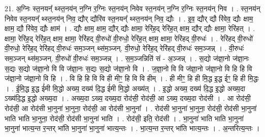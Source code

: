\documentclass[17pt]{extarticle}
\begin{document}
21. अ॒ग्निः स्त॒नयन्᳚ थ्स्त॒नय॑न् न॒ग्नि र॒ग्निः स्त॒नय॑न् निवेव स्त॒नय॑न् न॒ग्नि र॒ग्निः स्त॒नय॑न् निव । . स्त॒नय॑न् निवेव स्त॒नयन्᳚ थ्स्त॒नय॑न् निव॒ द्यौर् द्यौरि॑व स्त॒नयन्᳚ थ्स्त॒नय॑न् निव॒ द्यौः । . इ॒व॒ द्यौर् द्यौ रि॑वेव॒ द्यौः क्षाम॒ क्षाम॒ द्यौ रि॑वेव॒ द्यौः क्षाम॑ । . द्यौः क्षाम॒ क्षाम॒ द्यौर् द्यौः क्षामा॒ रेरि॑ह॒द् रेरि॑ह॒त् क्षाम॒ द्यौर् द्यौः क्षामा॒ रेरि॑हत् । . क्षामा॒ रेरि॑ह॒द् रेरि॑ह॒त् क्षाम॒ क्षामा॒ रेरि॑हद् वी॒रुधो॑ वी॒रुधो॒ रेरि॑ह॒त् क्षाम॒ क्षामा॒ रेरि॑हद् वी॒रुधः॑ । . रेरि॑हद् वी॒रुधो॑ वी॒रुधो॒ रेरि॑ह॒द् रेरि॑हद् वी॒रुधः॑ सम॒ञ्जन् थ्स॑म॒ञ्जन्. वी॒रुधो॒ रेरि॑ह॒द् रेरि॑हद् वी॒रुधः॑ सम॒ञ्जन्न् । . वी॒रुधः॑ सम॒ञ्जन् थ्स॑म॒ञ्जन्. वी॒रुधो॑ वी॒रुधः॑ सम॒ञ्जन्न् । . स॒म॒ञ्जन्निति॑ सं - अ॒ञ्जन्न् । . स॒द्यो ज॑ज्ञा॒नो ज॑ज्ञा॒नः स॒द्यः स॒द्यो ज॑ज्ञा॒नो वि वि ज॑ज्ञा॒नः स॒द्यः स॒द्यो ज॑ज्ञा॒नो वि । . ज॒ज्ञा॒नो वि वि ज॑ज्ञा॒नो ज॑ज्ञा॒नो वि हि हि वि ज॑ज्ञा॒नो ज॑ज्ञा॒नो वि हि । . वि हि हि वि वि ही मीꣳ॒॒ हि वि वि हीम् । . ही मीꣳ॒॒ हि ही मि॒द्ध इ॒द्ध ईꣳ॒॒ हि ही मि॒द्धः । . ई॒मि॒द्ध इ॒द्ध ई॑मी मि॒द्धो अख्य॒ दख्य॑ दि॒द्ध ई॑मी मि॒द्धो अख्य॑त् । . इ॒द्धो अख्य॒ दख्य॑ दि॒द्ध इ॒द्धो अख्य॒दा ऽख्य॑दि॒द्ध इ॒द्धो अख्य॒दा । . अख्य॒दा ऽख्य॒ दख्य॒दा रोद॑सी॒ रोद॑सी॒ आ ऽख्य॒ दख्य॒दा रोद॑सी । . आ रोद॑सी॒ रोद॑सी॒ आ रोद॑सी भा॒नुना॑ भा॒नुना॒ रोद॑सी॒ आ रोद॑सी भा॒नुना᳚ । . रोद॑सी भा॒नुना॑ भा॒नुना॒ रोद॑सी॒ रोद॑सी भा॒नुना॑ भाति भाति भा॒नुना॒ रोद॑सी॒ रोद॑सी भा॒नुना॑ भाति । . रोद॑सी॒ इति॒ रोद॑सी । . भा॒नुना॑ भाति भाति भा॒नुना॑ भा॒नुना॑ भात्य॒न्त र॒न्तर् भा॑ति भा॒नुना॑ भा॒नुना॑ भात्य॒न्तः । . भा॒त्य॒न्त र॒न्तर् भा॑ति भात्य॒न्तः । . अ॒न्तरित्य॒न्तः । \newline
\end{document}
